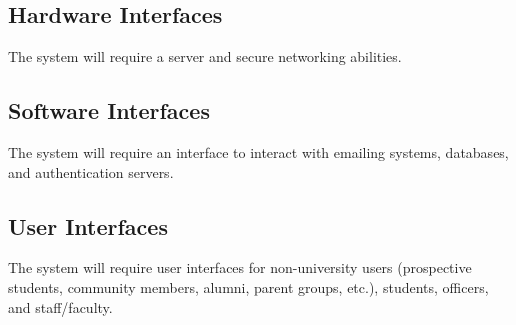 \subsection{Hardware Interfaces}
			The system will require a server and secure networking
			abilities.
		\subsection{Software Interfaces}
			The system will require an interface to interact with
			emailing systems, databases, and authentication servers.
		\subsection{User Interfaces}
			The system will require user interfaces for non-university
			users (prospective students, community members, alumni,
			parent groups, etc.), students, officers, and staff/faculty.
